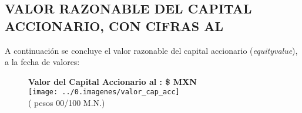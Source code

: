 
\subsection{VALOR RAZONABLE DEL CAPITAL ACCIONARIO, CON CIFRAS AL \fechaValoresCorto}

A continuaci\'on se concluye el valor razonable del capital accionario (\textit{\gls{equityvalue}}), a la fecha de valores:\\

\begin{figure}[H]
\centering
\textbf{\textcolor{principal}{Valor del Capital Accionario al \fechaValoresCorto:} \$\valorCapital{} MXN}\\
\texttt{[image: ../0.imagenes/valor\_cap\_acc]}\\
(\textcolor{principal}{\valorCapitalLetra{} pesos 00/100 M.N.})


\end{figure}
